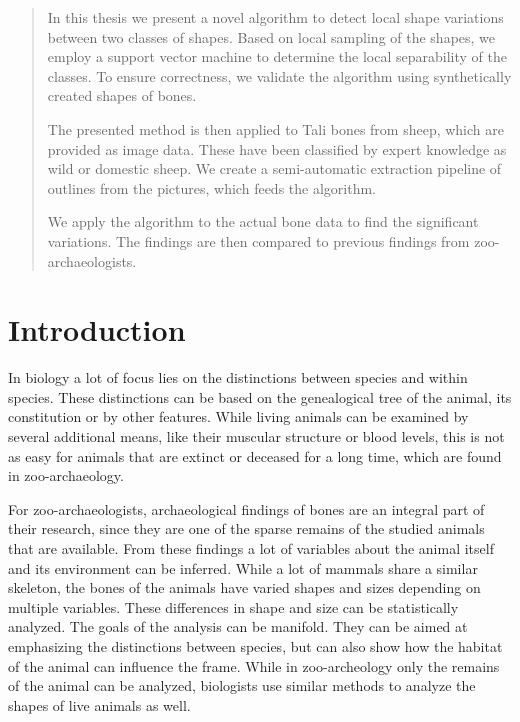 \documentclass[pdftex,12pt,a4paper]{report}
\begin{document}
\deckblatt

\erklaerung

\begin{abstract}
In this thesis we present a novel algorithm to detect local shape variations between two classes of shapes. Based on local sampling of the shapes, we employ a support vector machine to determine the local separability of the classes. To ensure correctness, we validate the algorithm using synthetically created shapes of bones.

The presented method is then applied to Tali bones from sheep, which are provided as image data. These have been classified by expert knowledge as wild or domestic sheep. We create a semi-automatic extraction pipeline of outlines from the pictures, which feeds the algorithm.

We apply the algorithm to the actual bone data to find the significant variations. The findings are then compared to previous findings from zoo-archaeologists.
\end{abstract}

\tableofcontents

\chapter{Introduction}

In biology a lot of focus lies on the distinctions between species and within species. These distinctions can be based on the genealogical tree of the animal, its constitution or by other features. While living animals can be examined by several additional means, like their muscular structure or blood levels, this is not as easy for animals that are extinct or deceased for a long time, which are found in zoo-archaeology.

For zoo-archaeologists, archaeological findings of bones are an integral part of their research, since they are one of the sparse remains of the studied animals that are available. From these findings a lot of variables about the animal itself and its environment can be inferred. While a lot of mammals share a similar skeleton, the bones of the animals have varied shapes and sizes depending on multiple variables. These differences in shape and size can be statistically analyzed. The goals of the analysis can be manifold. They can be aimed at emphasizing the distinctions between species, but can also show how the habitat of the animal can influence the frame. While in zoo-archeology only the remains of the animal can be analyzed, biologists use similar methods to analyze the shapes of live animals as well.
\end{document}

